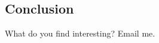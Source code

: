 \documentclass[12pt,pdftex]{article}
\begin{document}
\begin{onehalfspacing}
%
%
%
%
%


\section{Conclusion}

What do you find interesting? Email me.




\end{onehalfspacing}
\end{document}
